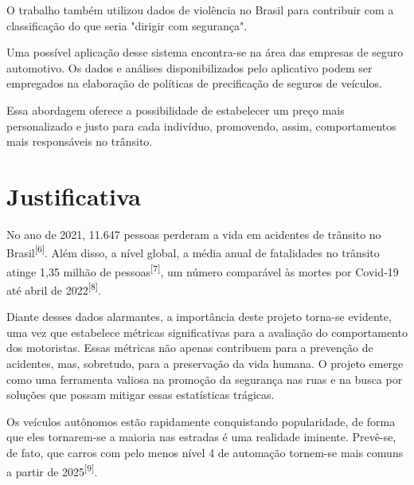 O trabalho também utilizou dados de violência no Brasil para contribuir com a classificação do que seria "dirigir com segurança".



Uma possível aplicação desse sistema encontra-se na área das empresas de seguro automotivo. Os dados e análises disponibilizados pelo aplicativo podem ser empregados na elaboração de políticas de precificação de seguros de veículos. 

Essa abordagem oferece a possibilidade de estabelecer um preço mais personalizado e justo para cada indivíduo, promovendo, assim, comportamentos mais responsáveis no trânsito. 


 
\section{Justificativa}
No ano de 2021, 11.647 pessoas perderam a vida em acidentes de trânsito no Brasil\textsuperscript{[6]}. Além disso, a nível global, a média anual de fatalidades no trânsito atinge 1,35 milhão de pessoas\textsuperscript{[7]}, um número comparável às mortes por Covid-19 até abril de 2022\textsuperscript{[8]}.

Diante desses dados alarmantes, a importância deste projeto torna-se evidente, uma vez que estabelece métricas significativas para a avaliação do comportamento dos motoristas. Essas métricas não apenas contribuem para a prevenção de acidentes, mas, sobretudo, para a preservação da vida humana. O projeto emerge como uma ferramenta valiosa na promoção da segurança nas ruas e na busca por soluções que possam mitigar essas estatísticas trágicas.

Os veículos autônomos estão rapidamente conquistando popularidade, de forma que eles tornarem-se a maioria nas estradas é uma realidade iminente. Prevê-se, de fato, que carros com pelo menos nível 4 de automação tornem-se mais comuns a partir de 2025\textsuperscript{[9]}.

